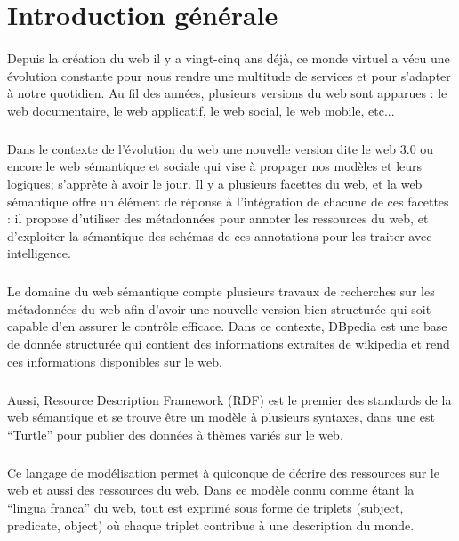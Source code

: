 \section*{Introduction générale}
\paragraph{}
Depuis la création du web il y a vingt-cinq ans déjà, ce monde virtuel a vécu une évolution constante pour nous rendre une multitude de services et pour s’adapter à notre quotidien. Au fil des années, plusieurs versions du web sont apparues : le web documentaire, le web applicatif, le web social, le web mobile, etc...
\subparagraph{}
Dans le contexte de l’évolution du web une nouvelle version dite le web 3.0 ou encore le web sémantique et sociale qui vise à propager nos modèles et leurs logiques; s’apprête à avoir le jour. Il y a plusieurs facettes du web, et la web sémantique oﬀre un élément de réponse à l’intégration de chacune de ces facettes : il propose d’utiliser des métadonnées pour annoter les ressources du web, et d’exploiter la sémantique des schémas de ces annotations pour les traiter avec intelligence.
\subparagraph{}
Le domaine du web sémantique compte plusieurs travaux de recherches sur les métadonnées du web aﬁn d’avoir une nouvelle version bien structurée qui soit capable d’en assurer le contrôle eﬃcace. Dans ce contexte, DBpedia est une base de donnée structurée qui contient des informations extraites de wikipedia et rend ces informations disponibles sur le web.
\subparagraph{}
Aussi, Resource Description Framework (RDF) est le premier des standards de la web sémantique et se trouve être un modèle à plusieurs syntaxes, dans une est  “Turtle” pour publier des données à thèmes variés sur le web.
\subparagraph{}
Ce langage de modélisation permet à quiconque de décrire des ressources sur le web et aussi des ressources du web. Dans ce modèle connu comme étant la “lingua franca” du web, tout est exprimé sous forme de triplets (subject, predicate, object) où chaque triplet contribue à une description du monde.
